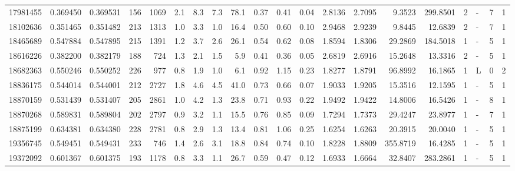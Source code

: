 \begin{center}
\begin{tabular}{rccrrccrrrrrrrrrrlrr}
  17981455 & 0.369450 & 0.369531 &  156 & 1069 &      2.1 &      8.3 &     7.3 &    78.1 &   0.37 &   0.41 &       0.04 &  2.8136 &  2.7095 &    9.3523 &  299.8501 &       2 &             - &        7 &         1 \\
  18102636 & 0.351465 & 0.351482 &  213 & 1313 &      1.0 &      3.3 &     1.0 &    16.4 &   0.50 &   0.60 &       0.10 &  2.9468 &  2.9239 &    9.8445 &   12.6839 &       2 &             - &        7 &         1 \\
  18465689 & 0.547884 & 0.547895 &  215 & 1391 &      1.2 &      3.7 &     2.6 &    26.1 &   0.54 &   0.62 &       0.08 &  1.8594 &  1.8306 &   29.2869 &  184.5018 &       1 &             - &        5 &         1 \\
  18616226 & 0.382200 & 0.382179 &  188 &  724 &      1.3 &      2.1 &     1.5 &     5.9 &   0.41 &   0.36 &       0.05 &  2.6819 &  2.6916 &   15.2648 &   13.3316 &       2 &             - &        5 &         1 \\
  18682363 & 0.550246 & 0.550252 &  226 &  977 &      0.8 &      1.9 &     1.0 &     6.1 &   0.92 &   1.15 &       0.23 &  1.8277 &  1.8791 &   96.8992 &   16.1865 &       1 &             L &        0 &         2 \\
  18836175 & 0.544014 & 0.544001 &  212 & 2727 &      1.8 &      4.6 &     4.5 &    41.0 &   0.73 &   0.66 &       0.07 &  1.9033 &  1.9205 &   15.3516 &   12.1595 &       1 &             - &        5 &         1 \\
  18870159 & 0.531439 & 0.531407 &  205 & 2861 &      1.0 &      4.2 &     1.3 &    23.8 &   0.71 &   0.93 &       0.22 &  1.9492 &  1.9422 &   14.8006 &   16.5426 &       1 &             - &        8 &         1 \\
  18870268 & 0.589831 & 0.589804 &  202 & 2797 &      0.9 &      3.2 &     1.1 &    15.5 &   0.76 &   0.85 &       0.09 &  1.7294 &  1.7373 &   29.4247 &   23.8977 &       1 &             - &        7 &         1 \\
  18875199 & 0.634381 & 0.634380 &  228 & 2781 &      0.8 &      2.9 &     1.3 &    13.4 &   0.81 &   1.06 &       0.25 &  1.6254 &  1.6263 &   20.3915 &   20.0040 &       1 &             - &        5 &         1 \\
  19356745 & 0.549451 & 0.549431 &  233 &  746 &      1.4 &      2.6 &     3.1 &    18.8 &   0.84 &   0.74 &       0.10 &  1.8228 &  1.8809 &  355.8719 &   16.4285 &       1 &             - &        5 &         1 \\
  19372092 & 0.601367 & 0.601375 &  193 & 1178 &      0.8 &      3.3 &     1.1 &    26.7 &   0.59 &   0.47 &       0.12 &  1.6933 &  1.6664 &   32.8407 &  283.2861 &       1 &             - &        5 &         1 \\

\end{tabular}
\end{center}
